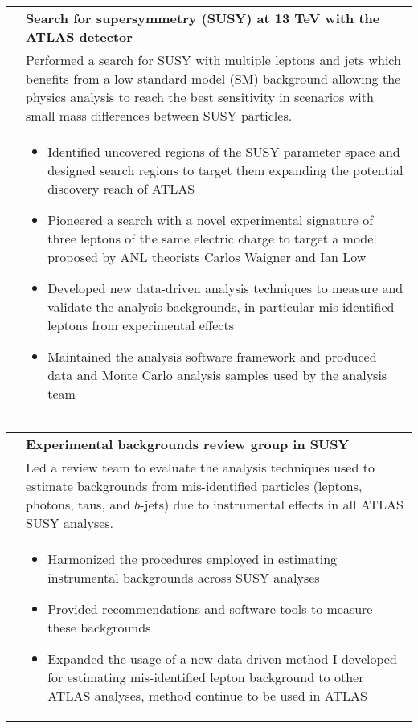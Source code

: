 \documentclass[a4paper,10pt]{article}
\begin{document}
\begin{tabularx}{\textwidth}{>{\centering\arraybackslash}X p{} }
  {\sl 2015--2017} & {\bf Search for supersymmetry (SUSY) at 13 TeV with the ATLAS detector} \\
  & Performed a search for SUSY with multiple leptons and jets which benefits from a low
  standard model (SM) background allowing the physics analysis to reach the best sensitivity in scenarios with small
  mass differences between SUSY particles.\\[-1.5ex]
  & \begin{itemize}
  \item Identified uncovered regions of the SUSY parameter space and designed search regions to target them expanding the
    potential discovery reach of ATLAS
  \item Pioneered a search with a novel experimental signature of three leptons of the same electric charge to target a model
    proposed by ANL theorists Carlos Waigner and Ian Low
  \item Developed new data-driven analysis techniques to measure and validate the analysis backgrounds, in particular mis-identified
    leptons from experimental effects
  \item Maintained the analysis software framework and produced data and Monte Carlo analysis samples used by the analysis team
  \end{itemize}\\[-1.5ex]
\end{tabularx}

\begin{tabularx}{\textwidth}{>{\centering\arraybackslash}X p{} }
 {\sl 2016--2017} & {\bf Experimental backgrounds review group in SUSY} \\
  & Led a review team to evaluate the analysis techniques used to estimate backgrounds from mis-identified particles
  (leptons, photons, taus, and $b$-jets) due to instrumental effects in all ATLAS SUSY analyses.\\
  & \begin{itemize}
  \item Harmonized the procedures employed in estimating instrumental backgrounds across SUSY analyses
  \item Provided recommendations and software tools to measure these backgrounds
  \item Expanded the usage of a new data-driven method I developed for estimating mis-identified lepton background to other ATLAS analyses,
  method continue to be used in ATLAS
  \end{itemize}\\
\end{tabularx}
\end{document}
